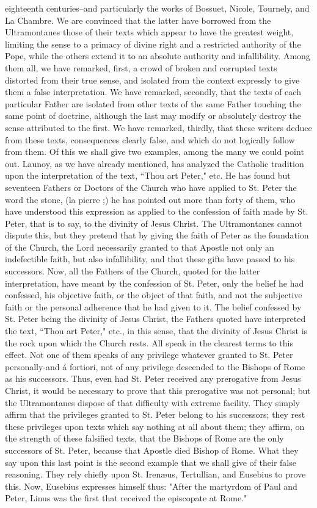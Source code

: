 eighteenth centuries--and particularly the works of Bossuet, Nicole, Tournely, and La Chambre. We are convinced that the latter have borrowed from the Ultramontanes those of their texts which appear to have the greatest weight, limiting the sense to a primacy of divine right and a restricted authority of the Pope, while the others extend it to an absolute authority and infallibility. Among them all, we have remarked, first, a crowd of broken and corrupted texts distorted from their true sense, and isolated from the context expressly to give them a false interpretation. We have remarked, secondly, that the texts of each particular Father are isolated from other texts of the same Father touching the same point of doctrine, although the last may modify or absolutely destroy the sense attributed to the first. We have remarked, thirdly, that these writers deduce from these texts, consequences clearly false, and which do not logically follow from them. Of this we shall give two examples, among the many we could point out. Launoy, as we have already mentioned, has analyzed the Catholic tradition upon the interpretation of the text, “Thou art Peter," etc. He has found but seventeen Fathers or Doctors of the Church who have applied to St. Peter the word the stone, (la pierre ;) he has pointed out more than forty of them, who have understood this expression as applied to the confession of faith made by St. Peter, that is to say, to the divinity of Jesus Christ. The Ultramontanes cannot dispute this, but they pretend that by giving the faith of Peter as the foundation of the Church, the Lord necessarily granted to that Apostle not only an indefectible faith, but also infallibility, and that these gifts have passed to his successors. Now, all the Fathers of the Church, quoted for the latter interpretation, have meant by the confession of St. Peter, only the belief he had confessed, his objective faith, or the object of that faith, and not the subjective faith or the personal adherence that he had given to it. The belief confessed by St. Peter being the divinity of Jesus Christ, the Fathers quoted have interpreted the text, “Thou art Peter," etc., in this sense, that the divinity of Jesus Christ is the rock upon which the Church rests. All speak in the clearest terms to this effect. Not one of them speaks of any privilege whatever granted to St. Peter personally-and á fortiori, not of any privilege descended to the Bishops of Rome as his successors. Thus, even had St. Peter received any prerogative from Jesus Christ, it would be necessary to prove that this prerogative was not personal; but the Ultramontanes dispose of that difficulty with extreme facility. They simply affirm that the privileges granted to St. Peter belong to his successors; they rest these privileges upon texts which say nothing at all about them; they affirm, on the strength of these falsified texts, that the Bishops of Rome are the only successors of St. Peter, because that Apostle died Bishop of Rome. What they say upon this last point is the second example that we shall give of their false reasoning. They rely chiefly upon St. Irenæus, Tertullian, and Eusebius to prove this. Now, Eusebius expresses himself thus: "After the martyrdom of Paul and Peter, Linus was the first that received the episcopate at Rome." 